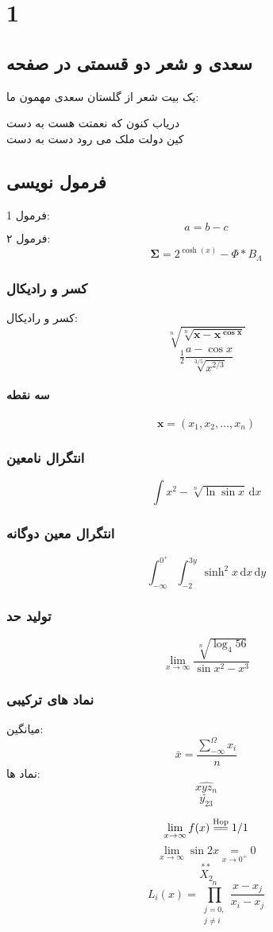 \documentclass{book}
\author{علی}
\begin{document}
	\maketitle
	\tableofcontents
	\singlespacing
\chapter{1}\label{chap1}
\section{سعدی و شعر دو قسمتی در صفحه}
	یک بیت شعر از گلستان سعدی مهمون ما:
\begin{multicols}{2}
	دریاب کنون که نعمتت هست به دست \\ کین دولت ملک می رود دست به دست
\end{multicols}
\section{فرمول نویسی}
فرمول 1:
\[
a = b - c
\]
فرمول ۲:
\[
\boldsymbol{\Sigma} = 2^{\cosh(x)} - \varPhi*B_{\varLambda}
\]
\subsection{کسر و رادیکال}
کسر و رادیکال: \\
\[
\sqrt[n]{\sqrt[n]{\boldsymbol{\mathbf{x - x^{\cos x}}}}}
\]
\[
\tfrac{1}{2} \frac{a - \cos x}{\sqrt[3/5]{x^{2/3}}}
\]
\subsubsection{سه نقطه}
\[
\mathbf{x} = (x_1, x_2, \dots, x_n)
\]
\subsection{انتگرال نامعین}
\[
\int x^2 - \sqrt[n]{\ln \sin x} \, \mathrm{d}x
\]
\subsection{انتگرال معین دوگانه}
\[
\int_{-\infty}^{0^{+}} \int_{-2}^{3y} \sinh ^2 x \, \mathrm{d}x \, \mathrm{d}y
\]
\subsection{تولید حد}
\[
\lim_{x \to \infty} \frac{\sqrt[n]{\log_4 56}}{\sin x^2 - x^3}
\]
\subsection{نماد های ترکیبی}
\begin{flushright}
میانگین:
\[
\bar{x} = \frac{\sum_{-\infty}^{\varOmega} x_i}{n} 
\]
نماد ها:
\[
\widehat{xyz_n}
\]
\[
\widetilde{y_{23}}
\]
\end{flushright}
\[
\lim_{x \to \infty} f(x) \overset{\mathrm{Hop}}{=\joinrel=} 1/1
\]
\[
\lim_{x \to \infty} \sin 2x \underset{x \xrightarrow{} 0^{+}}{=} 0
\]
\[
\overset{\ast\ast}{X_{2}}
\]
\[
L_i(x) = \prod_{\substack{j = 0, \\ j \neq i}}^n \frac{x - x_j}{x_i - x_j}
\]
\end{document}
